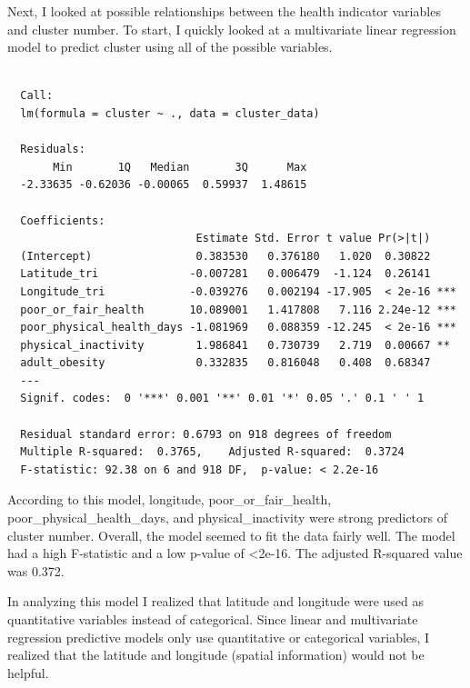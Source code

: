 \documentclass[12pt,twoside]{amherstthesis}
\begin{document}
  Next, I looked at possible relationships between the health indicator
  variables and cluster number. To start, I quickly looked at a
  multivariate linear regression model to predict cluster using all of the
  possible variables.
  
  \begin{Shaded}
  \begin{Highlighting}[]
  \StringTok{ }\OperatorTok{~}
  \end{Highlighting}
  \end{Shaded}
  
  \begin{verbatim}
  
  Call:
  lm(formula = cluster ~ ., data = cluster_data)
  
  Residuals:
       Min       1Q   Median       3Q      Max 
  -2.33635 -0.62036 -0.00065  0.59937  1.48615 
  
  Coefficients:
                             Estimate Std. Error t value Pr(>|t|)    
  (Intercept)                0.383530   0.376180   1.020  0.30822    
  Latitude_tri              -0.007281   0.006479  -1.124  0.26141    
  Longitude_tri             -0.039276   0.002194 -17.905  < 2e-16 ***
  poor_or_fair_health       10.089001   1.417808   7.116 2.24e-12 ***
  poor_physical_health_days -1.081969   0.088359 -12.245  < 2e-16 ***
  physical_inactivity        1.986841   0.730739   2.719  0.00667 ** 
  adult_obesity              0.332835   0.816048   0.408  0.68347    
  ---
  Signif. codes:  0 '***' 0.001 '**' 0.01 '*' 0.05 '.' 0.1 ' ' 1
  
  Residual standard error: 0.6793 on 918 degrees of freedom
  Multiple R-squared:  0.3765,    Adjusted R-squared:  0.3724 
  F-statistic: 92.38 on 6 and 918 DF,  p-value: < 2.2e-16
  \end{verbatim}
  
  According to this model, longitude, poor\_or\_fair\_health,
  poor\_physical\_health\_days, and physical\_inactivity were strong
  predictors of cluster number. Overall, the model seemed to fit the data
  fairly well. The model had a high F-statistic and a low p-value of
  \textless{}2e-16. The adjusted R-squared value was 0.372.
  
  In analyzing this model I realized that latitude and longitude were used
  as quantitative variables instead of categorical. Since linear and
  multivariate regression predictive models only use quantitative or
  categorical variables, I realized that the latitude and longitude
  (spatial information) would not be helpful.
  
\end{document}

